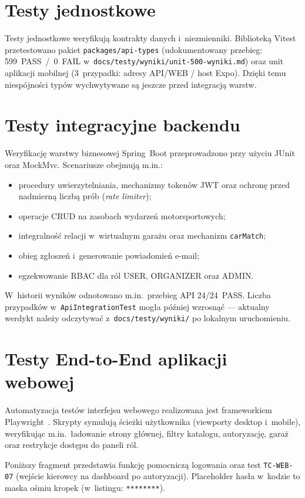 \documentclass{sprz}
\begin{document}
\section{Testy jednostkowe}
Testy jednostkowe weryfikują kontrakty danych i~niezmienniki. Biblioteką Vitest przetestowano pakiet \texttt{packages/\allowbreak api-\allowbreak types} (udokumentowany przebieg: 599~PASS~/~0~FAIL w~\texttt{docs/\allowbreak testy/\allowbreak wyniki/\allowbreak unit-500-wyniki.md}) oraz unit aplikacji mobilnej (3~przypadki: adresy API/WEB / host Expo). Dzięki temu niespójności typów wychwytywane są jeszcze przed integracją warstw.

\section{Testy integracyjne backendu}
Weryfikację warstwy biznesowej Spring~Boot przeprowadzono przy użyciu JUnit oraz MockMvc. Scenariusze obejmują m.in.:
\begin{itemize}
  \item procedury uwierzytelniania, mechanizmy tokenów JWT oraz ochronę przed nadmierną liczbą prób (\emph{rate limiter});
  \item operacje CRUD na zasobach wydarzeń motorsportowych;
  \item integralność relacji w~wirtualnym garażu oraz mechanizm \texttt{carMatch};
  \item obieg zgłoszeń i~generowanie powiadomień e-mail;
  \item egzekwowanie RBAC dla ról USER, ORGANIZER oraz ADMIN.
\end{itemize}
W~historii wyników odnotowano m.in.\ przebieg API 24/24~PASS. Liczba przypadków w~\texttt{Api\-Integration\-Test} mogła później wzrosnąć --- aktualny werdykt należy odczytywać z~\texttt{docs/\allowbreak testy/\allowbreak wyniki/} po lokalnym uruchomieniu.

\section{Testy End-to-End aplikacji webowej}
Automatyzacja testów interfejsu webowego realizowana jest frameworkiem Playwright~\cite{playwright:docs}. Skrypty symulują ścieżki użytkownika (viewporty desktop i~mobile), weryfikując m.in.\ ładowanie strony głównej, filtry katalogu, autoryzację, garaż oraz restrykcje dostępu do paneli ról.

Poniższy fragment przedstawia funkcję pomocniczą logowania oraz test \texttt{TC-WEB-07} (wejście kierowcy na dashboard po autoryzacji). Placeholder hasła w~kodzie to maska ośmiu kropek (w~listingu: \texttt{********}).
\end{document}
